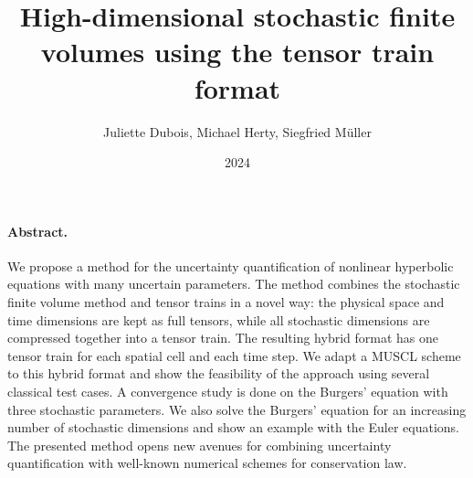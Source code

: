 \documentclass{article}
\title{High-dimensional stochastic finite volumes using the tensor train format}
\author{Juliette Dubois, Michael Herty, Siegfried M\"uller}
\date{2024}
\begin{document}
\maketitle



\paragraph{Abstract. }
We propose a method for the uncertainty quantification of nonlinear hyperbolic equations with many uncertain parameters. 
The method combines the stochastic finite volume method and tensor trains in a novel way: 
the physical space and time dimensions are kept as full tensors, while all stochastic dimensions are compressed together into a tensor train. 
The resulting hybrid format has  one tensor train for each spatial cell and each time step. 
We adapt a MUSCL scheme to this hybrid format and show the feasibility of the approach using several classical test cases. 
A convergence study is done on the Burgers' equation with three stochastic parameters.
We also solve the Burgers' equation for an increasing number of stochastic dimensions and show an example with the Euler equations. 
The presented method opens new avenues for combining uncertainty quantification with well-known numerical schemes for conservation law.  
\end{document}
